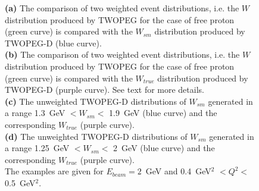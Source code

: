 \begin{figure}[!ht]
\begin{center}
\end{center}
\caption{\small {\bf(a)} The comparison of two weighted event distributions, i.e. the $W$ distribution produced by TWOPEG for the case of free proton (green curve) is compared with the $W_{sm}$ distribution produced by TWOPEG-D (blue curve). \\\textbf{(b)} The comparison of two weighted event distributions, i.e. the $W$ distribution produced by TWOPEG for the case of free proton (green curve) is compared with the $W_{true}$ distribution produced by TWOPEG-D (purple curve). See text for more details.\\ \textbf{(c)} The unweighted TWOPEG-D  distributions of $W_{sm}$ generated in a range 1.3~GeV $< W_{sm} <$ 1.9~GeV (blue curve) and the corresponding $W_{true}$ (purple curve).\\\textbf{(d)} The unweighted TWOPEG-D  distributions of $W_{sm}$ generated in a range 1.25~GeV $< W_{sm} <$ 2~GeV (blue curve) and the corresponding $W_{true}$ (purple curve). \\The examples are given for $E_{beam} = 2$~GeV and 0.4~GeV$^{2}$ $<Q^{2}<$ 0.5~GeV$^{2}$.}
\label{fig:weights_w_dep}
\end{figure}




